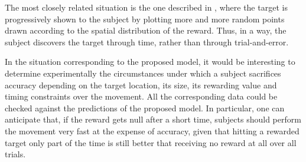\documentclass[10pt]{article}
\begin{document}
The most closely related situation is the one described in \cite{Battaglia2007}, 
where the target is progressively shown to the subject by plotting more
and more random points drawn according to the spatial distribution of the reward. Thus, in a way,
the subject discovers the target through time, rather than through trial-and-error.

In the situation corresponding to the proposed model, it would be interesting to determine
experimentally the circumstances
under which a subject sacrifices accuracy depending on the target location, its size,
its rewarding value and timing constraints over the movement. All the corresponding
data could be checked against the predictions of the proposed model.
In particular, one can anticipate that, if the reward gets null after a short time, subjects
should perform the movement very fast at the expense of accuracy, given that hitting a rewarded target only
part of the time is still better that receiving no reward at all over all trials.





\end{document}
